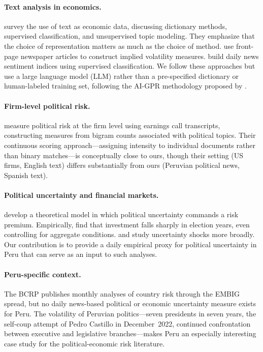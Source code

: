 \documentclass[12pt,a4paper]{article}
\begin{document}
\paragraph{Text analysis in economics.}
\cite{gentzkow2019} survey the use of text as economic data, discussing
dictionary methods, supervised classification, and unsupervised topic
modeling. They emphasize that the choice of representation matters as
much as the choice of method. \cite{manela2017} use front-page newspaper
articles to construct implied volatility measures. \cite{shapiro2022} build
daily news sentiment indices using supervised classification. We follow
these approaches but use a large language model (LLM) rather than a
pre-specified dictionary or human-labeled training set, following the AI-GPR
methodology proposed by \cite{iacoviello2026}.

\paragraph{Firm-level political risk.}
\cite{hassan2019} measure political risk at the firm level using
earnings call transcripts, constructing measures from bigram counts
associated with political topics. Their continuous scoring approach---assigning
intensity to individual documents rather than binary matches---is
conceptually close to ours, though their setting (US firms, English text)
differs substantially from ours (Peruvian political news, Spanish text).

\paragraph{Political uncertainty and financial markets.}
\cite{pastor2013} develop a theoretical model in which political uncertainty
commands a risk premium. Empirically, \cite{julio2012} find that investment
falls sharply in election years, even controlling for aggregate conditions.
\cite{bloom2009} and \cite{ludvigson2021} study uncertainty shocks more
broadly. Our contribution is to provide a daily empirical proxy for
political uncertainty in Peru that can serve as an input to such analyses.

\paragraph{Peru-specific context.}
The BCRP publishes monthly analyses of country risk through the EMBIG spread,
but no daily news-based political or economic uncertainty measure exists for
Peru.  The volatility of Peruvian politics---seven presidents in seven
years, the self-coup attempt of Pedro Castillo in December~2022, continued
confrontation between executive and legislative branches---makes Peru an
especially interesting case study for the political-economic risk literature.
\end{document}
